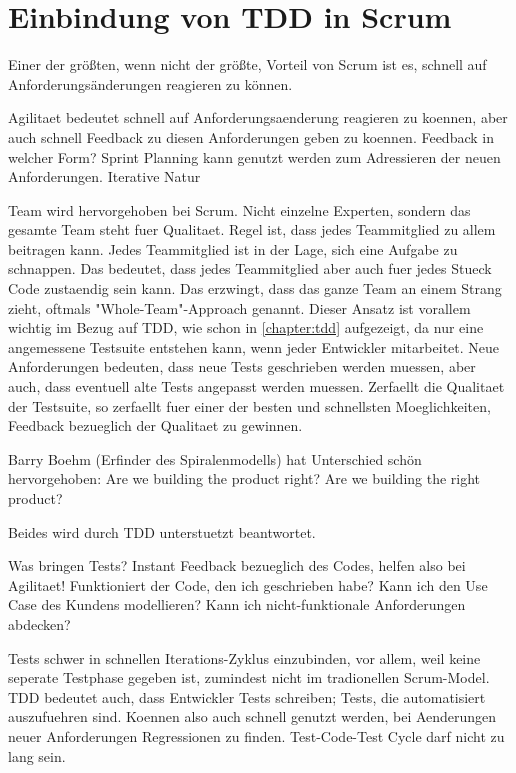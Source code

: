 \documentclass[12pt,DIV14,BCOR10mm,a4paper,twoside,parskip=half-,headsepline,headinclude,english,ngerman,bibliography=totocnumbered]{scrreprt}
\begin{document}
\chapter{Einbindung von TDD in Scrum}

Einer der größten, wenn nicht der größte, Vorteil von Scrum ist es, schnell auf Anforderungsänderungen reagieren zu können.



Agilitaet bedeutet schnell auf Anforderungsaenderung reagieren zu koennen, aber auch schnell Feedback zu diesen Anforderungen geben zu koennen.
Feedback in welcher Form?
Sprint Planning kann genutzt werden zum Adressieren der neuen Anforderungen.
Iterative Natur

Team wird hervorgehoben bei Scrum.
Nicht einzelne Experten, sondern das gesamte Team steht fuer Qualitaet.
Regel ist, dass jedes Teammitglied zu allem beitragen kann.
Jedes Teammitglied ist in der Lage, sich eine Aufgabe zu schnappen.
Das bedeutet, dass jedes Teammitglied aber auch fuer jedes Stueck Code zustaendig sein kann.
Das erzwingt, dass das ganze Team an einem Strang zieht, oftmals "Whole-Team"-Approach genannt.
Dieser Ansatz ist vorallem wichtig im Bezug auf TDD, wie schon in \ref{chapter:tdd} aufgezeigt, da nur eine angemessene Testsuite entstehen kann, wenn jeder Entwickler mitarbeitet.
Neue Anforderungen bedeuten, dass neue Tests geschrieben werden muessen, aber auch, dass eventuell alte Tests angepasst werden muessen.
Zerfaellt die Qualitaet der Testsuite, so zerfaellt fuer einer der besten und schnellsten Moeglichkeiten, Feedback bezueglich der Qualitaet zu gewinnen.

Barry Boehm (Erfinder des Spiralenmodells) hat Unterschied schön hervorgehoben:
Are we building the product right?
Are we building the right product?

Beides wird durch TDD unterstuetzt beantwortet.

Was bringen Tests?
Instant Feedback bezueglich des Codes, helfen also bei Agilitaet!
Funktioniert der Code, den ich geschrieben habe?
Kann ich den Use Case des Kundens modellieren?
Kann ich nicht-funktionale Anforderungen abdecken?

Tests schwer in schnellen Iterations-Zyklus einzubinden, vor allem, weil keine seperate Testphase gegeben ist, zumindest nicht im tradionellen Scrum-Model.
TDD bedeutet auch, dass Entwickler Tests schreiben; Tests, die automatisiert auszufuehren sind.
Koennen also auch schnell genutzt werden, bei Aenderungen neuer Anforderungen Regressionen zu finden.
Test-Code-Test Cycle darf nicht zu lang sein.
\end{document}
